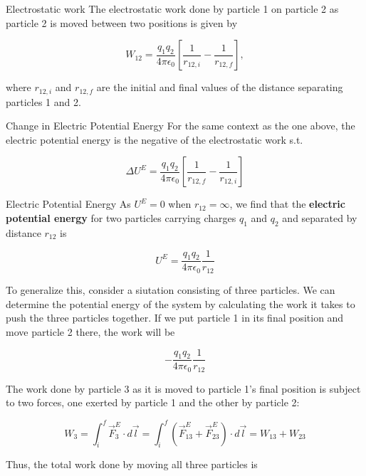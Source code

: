         \begin{theorem}{Electrostatic work}
            The electrostatic work done by particle 1 on particle 2 as particle 2 is moved between two positions is given by

            \[
                W_{12} = \frac{q_1 q_2}{4\pi \epsilon_0}\left[\frac{1}{r_{12,i}}-\frac{1}{r_{12,f}}\right],
            \]

            where $r_{12,i}$ and $r_{12,f}$ are the initial and final values of the distance separating particles 1 and 2.
        \end{theorem}

        \begin{theorem}{Change in Electric Potential Energy}
            For the same context as the one above, the electric potential energy is the negative of the electrostatic work s.t.

            \[
                \Delta U^E = \frac{q_1 q_2}{4\pi \epsilon_0} \left[\frac{1}{r_{12,f}} - \frac{1}{r_{12,i}}\right]
            \]
        \end{theorem}

        \begin{theorem}{Electric Potential Energy}
            As $U^E = 0$ when $r_{12} = \infty$, we find that the \textbf{electric potential energy} for two particles carrying charges $q_1$ and $q_2$ and separated by distance $r_{12}$ is

            \[
                U^E = \frac{q_1 q_2}{4\pi\epsilon_0} \frac{1}{r_{12}}
            \]
        \end{theorem}

        To generalize this, consider a siutation consisting of three particles. We can determine the potential energy of the system by calculating the work it takes to push the three particles together. If we put
        particle 1 in its final position and move particle 2 there, the work will be

        \[
            -\frac{q_1 q_2}{4\pi\epsilon_0}\frac{1}{r_{12}}
        \]

        The work done by particle 3 as it is moved to particle 1's final position is subject to two forces, one exerted by particle 1 and the other by particle 2:

        \[
            W_3 = \int_i^f \vec{F}^E_3 \cdot d\vec{l} = \int_i^f \left(\vec{F}^E_{13} + \vec{F}^E_{23}\right)\cdot d\vec{l} = W_{13} + W_{23}
        \]

        Thus, the total work done by moving all three particles is

